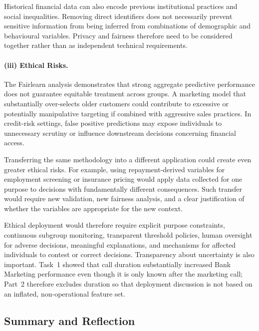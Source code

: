 \documentclass[11pt,a4paper]{article}
\begin{document}
Historical financial data can also encode previous institutional practices and social
inequalities. Removing direct identifiers does not necessarily prevent sensitive
information from being inferred from combinations of demographic and behavioural
variables. Privacy and fairness therefore need to be considered together rather than
as independent technical requirements.

\paragraph{(iii) Ethical Risks.}
The Fairlearn analysis demonstrates that strong aggregate predictive performance does
not guarantee equitable treatment across groups. A marketing model that substantially
over-selects older customers could contribute to excessive or potentially
manipulative targeting if combined with aggressive sales practices. In credit-risk
settings, false positive predictions may expose individuals to unnecessary scrutiny
or influence downstream decisions concerning financial access.

Transferring the same methodology into a different application could create even
greater ethical risks. For example, using repayment-derived variables for employment
screening or insurance pricing would apply data collected for one purpose to decisions
with fundamentally different consequences. Such transfer would require new validation,
new fairness analysis, and a clear justification of whether the variables are
appropriate for the new context.

Ethical deployment would therefore require explicit purpose constraints, continuous
subgroup monitoring, transparent threshold policies, human oversight for adverse
decisions, meaningful explanations, and mechanisms for affected individuals to contest
or correct decisions. Transparency about uncertainty is also important. Task~1 showed
that call duration substantially increased Bank Marketing performance even though it
is only known after the marketing call; Part~2 therefore excludes duration so that
deployment discussion is not based on an inflated, non-operational feature set.


\subsection{Summary and Reflection}
\label{sec:part2-summary}
\end{document}
